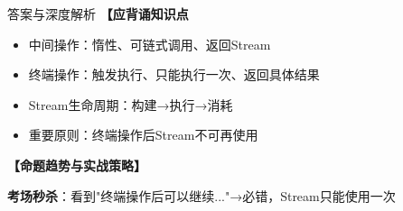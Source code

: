 \documentclass[12pt, a4paper]{ctexart}
\begin{document}
\begin{enumerate}[label=\textbf{\arabic*.}]
\begin{bluebox}{答案与深度解析}
		      \textbf{【应背诵知识点}
		      \begin{itemize}[label={}, nosep]
			      \item 中间操作：惰性、可链式调用、返回Stream
			      \item 终端操作：触发执行、只能执行一次、返回具体结果
			      \item Stream生命周期：构建→执行→消耗
			      \item 重要原则：终端操作后Stream不可再使用
		      \end{itemize}

		      \textbf{【命题趋势与实战策略】}

		      \textbf{考场秒杀}：看到"终端操作后可以继续..."→必错，Stream只能使用一次
	      \end{bluebox}

\end{enumerate}
\end{document}
